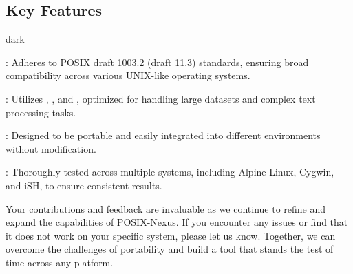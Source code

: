 \subsection{Key Features}
\label{sec:introduction:sub:feature}
\bigskip
\begin{baseBoxOne}{}{dark}
    \begin{posnexItemize}
        \item[\sA] : Adheres to POSIX draft 1003.2 (draft 11.3) standards, ensuring broad compatibility across various UNIX-like operating systems.
        \item[\sA] : Utilizes , , and , optimized for handling large datasets and complex text processing tasks.
        \item[\sA] : Designed to be portable and easily integrated into different environments without modification.
        \item[\sA] : Thoroughly tested across multiple systems, including Alpine Linux, Cygwin, and iSH, to ensure consistent results.
    \end{posnexItemize}
\end{baseBoxOne}
\bigskip
Your contributions and feedback are invaluable as we continue to refine and expand the capabilities of POSIX-Nexus. If you encounter any issues or find that it does not work on your specific system, please let us know. Together, we can overcome the challenges of portability and build a tool that stands the test of time across any platform.
